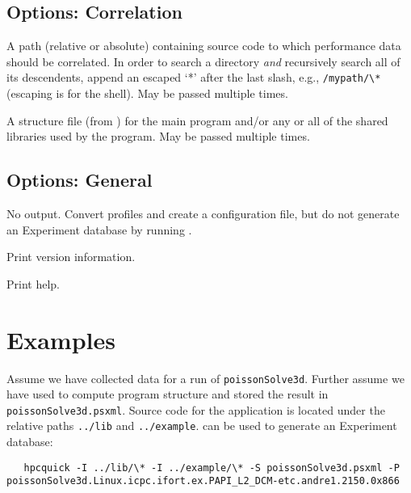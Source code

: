 \documentclass[english]{article}
\begin{document}
\subsection{Options: Correlation}

\begin{Description}
\item[\OptArg{-I}{path}] A path (relative or absolute) containing source code to which performance data should be correlated.  In order to search a directory \emph{and} recursively search all of its descendents, append an escaped `*' after the last slash, e.g., \verb+/mypath/\*+ (escaping is for the shell). May be passed multiple times.
\item[\OptArg{-S}{struct-file}] A structure file (from ) for the main program and/or any or all of the shared libraries used by the program.  May be passed multiple times.
\end{Description}

\subsection{Options: General}

\begin{Description}
\item[\Opt{-n}] No  output.  Convert profiles and create a configuration file, but do not generate an Experiment database by running .
\item[\Opt{-V}] Print version information.
\item[\Opt{-h}] Print help.
\end{Description}

\section{Examples}


Assume we have collected  data for a run of \texttt{poissonSolve3d}.  Further assume we have used  to compute program structure and stored the result in \texttt{poissonSolve3d.psxml}.  Source code for the application is located under the relative paths \verb+../lib+ and \verb+../example+.   can be used to generate an Experiment database:
\begin{verbatim}
   hpcquick -I ../lib/\* -I ../example/\* -S poissonSolve3d.psxml -P poissonSolve3d.Linux.icpc.ifort.ex.PAPI_L2_DCM-etc.andre1.2150.0x866
\end{verbatim}
\end{document}
